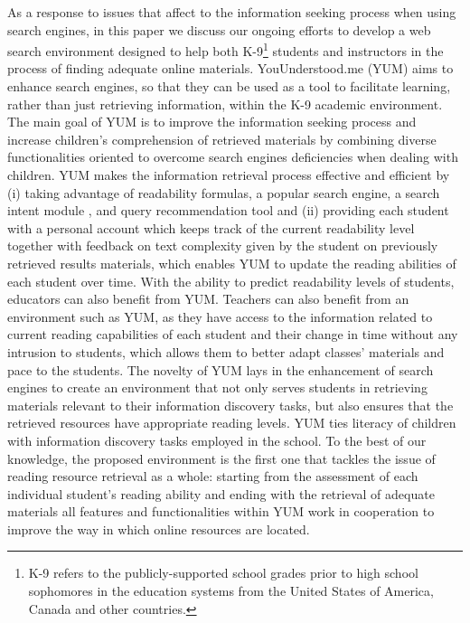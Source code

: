 \documentclass{sig-alternate-05-2015}
\begin{document}
As a response to issues that affect to the information seeking process when using search engines, in this paper we  discuss our ongoing efforts to develop a web search environment designed to help both K-9\footnote{ K-9 refers to the publicly-supported school grades prior to high school sophomores in the education systems from the United States of America, Canada and other countries.} students and instructors in the process of finding adequate online materials. YouUnderstood.me (YUM) aims to enhance search engines, so that they can be used as a tool to facilitate learning, rather than just retrieving information, within the K-9 academic environment. The main goal of YUM is to improve the information seeking process and increase children's comprehension of retrieved materials by combining diverse functionalities oriented to overcome search engines deficiencies when dealing with children. YUM makes the information retrieval process effective and efficient by (i) taking advantage of readability formulas, a popular search engine, a search intent module \cite{Quik}, and query recommendation tool \cite{Requik} and (ii) providing each student with a personal account which keeps track of the current readability level together with feedback on text complexity given by the student on previously retrieved results materials, which enables YUM to update the  reading abilities of each student over time. With the ability to predict readability levels of students, educators can also benefit from YUM. Teachers can also benefit from an environment such as YUM, as they have access to the information related to current reading capabilities of each student and their change in time without any intrusion to students, which allows them to better adapt classes' materials and pace to the students. 
The novelty of YUM lays in the enhancement of search engines to create an environment that not only serves students in retrieving materials relevant to their information discovery tasks, but also ensures that the retrieved resources have appropriate reading levels. YUM ties literacy of children with information discovery tasks employed in the school. To the best of our knowledge, the proposed environment is the first one that tackles the issue of reading resource retrieval as a whole: starting from the assessment of each individual student's reading ability and ending with the retrieval of adequate materials all features and functionalities within YUM work in cooperation to improve the way in which online resources are located. 
\end{document}
